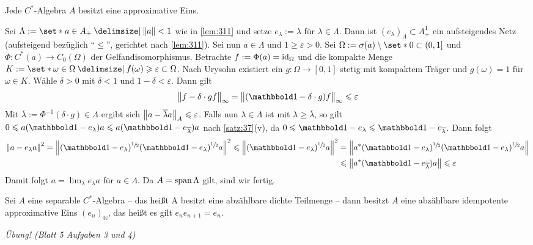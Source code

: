 \begin{satz}[{name=[Existenz von approximativen Einsen]},label=satz:313]
	Jede $C^*$-Algebra $A$ besitzt eine approximative Eins.
\end{satz}
\begin{beweis}
	Sei $\Lambda := \set*{a \in A_+ \given \norm*{a} < 1}$ wie in \autoref{lem:311} und setze $e_\lambda := \lambda$ für $\lambda \in \Lambda$. 
	Dann ist $(e_\lambda)_\Lambda \subset A_+^1$ ein aufsteigendes Netz (aufsteigend bezüglich \enquote{$\le$}, gerichtet nach \autoref{lem:311}). 
	Sei nun $a \in \Lambda$ und $1 \ge \varepsilon>0$. Sei $\Omega := \sigma(a) \setminus \set*{0} \subset (0,1]$ und $\Phi \colon C^*(a) \to C_0(\Omega)$ der Gelfandisomorphismus. 
	Betrachte $f := \Phi(a) = \id_\Omega$ und die kompakte Menge $K:= \set*{\omega \in \Omega \given f(\omega)\ge \varepsilon} \subset \Omega$. 
	Nach Urysohn existiert ein $g \colon \Omega \to [0,1]$ stetig mit kompaktem Träger und $g(\omega)=1$ für $\omega \in K$. 
	Wähle $\delta>0$ mit $\delta<1$ und $1-\delta< \varepsilon$. Dann gilt 
	\[
		\norm[\big]{f- \delta \cdot g f}_\infty = \norm[\big]{(\ind-\delta \cdot g) f}_\infty \le \varepsilon
	\]
	\noindent Mit $\overline{\lambda} := \Phi^{-1}(\delta \cdot g) \in \Lambda$ ergibt sich $\norm*{a- \overline{\lambda} a}_A \le \varepsilon$. 
	Falls nun $\lambda \in \Lambda$ ist mit $\lambda \ge \overline{\lambda}$, so gilt $0 \le a(\ind-e_\lambda)a \le a(\ind- e_{\overline{\lambda}})a$ nach \autoref{satz:37}(v), da $0 \le \ind - e_\lambda \le \ind -e_{\overline{\lambda}}$.
	Dann folgt 
	\begin{align}
		\norm*{a- e_\lambda a}^2 = \norm*{(\ind-e_\lambda)^{\sfrac{1}{2}} (\ind - e_\lambda)^{\sfrac{1}{2}} a}^2 \le \norm*{(\ind- e_\lambda)^{\sfrac{1}{2}}a}^2
		 &= \norm*{a^* (\ind -e_\lambda)^{\sfrac{1}{2}}(\ind-e_\lambda)^{\sfrac{1}{2}}a} \\
		 &\le \norm*{a^* (\ind-e_{\overline{\lambda}})a} \le \varepsilon
	\end{align}
	Damit folgt $a = \lim_\lambda e_\lambda a$ für $a \in \Lambda$. Da $A= \Span \Lambda$ gilt, sind wir fertig.
\end{beweis}

\begin{proposition}[{name=[approximative Einsen in separablen C*-Algbren]}]
	Sei $A$ eine separable $C^*$-Algebra -- das heißt A besitzt eine abzählbare dichte Teilmenge -- dann besitzt $A$ eine abzählbare idempotente approximative Eins $(e_n)_\mathbb{N}$, das heißt es gilt $e_n e_{n+1}=e_n$.
\end{proposition}
\begin{beweis}
	\emph{Übung! (Blatt 5 Aufgaben 3 und 4)}
\end{beweis}
\newpage

